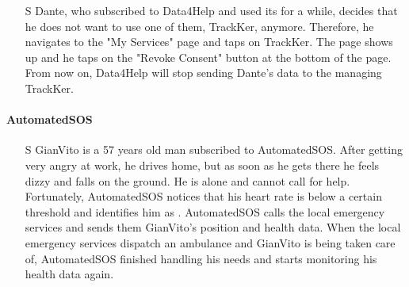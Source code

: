 \documentclass[../../rasd.tex]{subfiles}
\begin{document}
\begin{itemize}
                    \item[S\subs{6}] Dante, who subscribed to Data4Help and used its  for a while, decides that he does not want to use one of them, TrackKer, anymore. Therefore, he navigates to the "My Services" page and taps on TrackKer. The  page shows up and he taps on the "Revoke Consent" button at the bottom of the page. From now on, Data4Help will stop sending Dante's data to the  managing TrackKer.
                \end{itemize}

            \paragraph{AutomatedSOS}
                \begin{itemize}
                    \item[S\subs{7}] GianVito is a 57 years old man subscribed to AutomatedSOS. After getting very angry at work, he drives home, but as soon as he gets there he feels dizzy and falls on the ground. He is alone and cannot call for help. Fortunately, AutomatedSOS notices that his heart rate is below a certain threshold and identifies him as . AutomatedSOS calls the local emergency services and sends them GianVito's position and health data. When the local emergency services dispatch an ambulance and GianVito is being taken care of, AutomatedSOS finished handling his needs and starts monitoring his health data again.
                \end{itemize}
\end{document}
